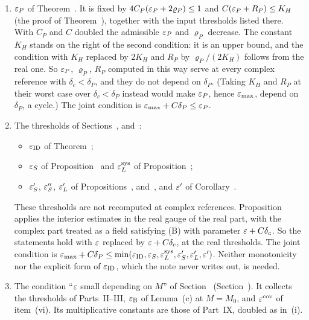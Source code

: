 \begin{detail}
\begin{step}
\begin{enumerate}[label=(\roman*)]
\item $\varepsilon_P$ of Theorem~. It is fixed by $4C_P(\varepsilon_P+2\varrho_P)\le1$ and $C(\varepsilon_P+R_P)\le K_H$ (the proof of Theorem~), together with the input thresholds listed there. With $C_P$ and $C$ doubled the admissible $\varepsilon_P$ and $\varrho_P$ decrease. The constant $K_H$ stands on the right of the second condition: it is an upper bound, and the condition with $K_H$ replaced by $2K_H$ and $R_P$ by $\varrho_P/(2K_H)$ follows from the real one. So $\varepsilon_P$, $\varrho_P$, $R_P$ computed in this way serve at every complex reference with $\delta_c<\delta_P$, and they do not depend on $\delta_P$. (Taking $K_H$ and $R_P$ at their worst case over $\delta_c<\delta_P$ instead would make $\varepsilon_P$, hence $\varepsilon_{\max}$, depend on $\delta_P$, a cycle.) The joint condition is $\varepsilon_{\max}+C\delta_P\le\varepsilon_P$.
\item The thresholds of Sections~,  and~:
\begin{itemize}
\item $\varepsilon_{\rm ID}$ of Theorem~;
\item $\varepsilon_S$ of Proposition~ and $\varepsilon_L^{\rm sys}$ of Proposition~;
\item $\varepsilon'_S$, $\varepsilon''_S$, $\varepsilon'_L$ of Propositions~,  and~, and $\varepsilon'$ of Corollary~.
\end{itemize}
These thresholds are not recomputed at complex references. Proposition~ applies the interior estimates in the real gauge of the real part, with the complex part treated as a field satisfying (B) with parameter $\varepsilon+C\delta_c$. So the statements hold with $\varepsilon$ replaced by $\varepsilon+C\delta_c$, at the real thresholds. The joint condition is $\varepsilon_{\max}+C\delta_P\le\min(\varepsilon_{\rm ID},\varepsilon_S,\varepsilon_L^{\rm sys},\varepsilon'_S,\varepsilon'_L,\varepsilon')$. Neither monotonicity nor the explicit form of $\varepsilon_{\rm ID}$, which the note never writes out, is needed.
\item The condition ``$\varepsilon$ small depending on $M$'' of Section~ (Section~). It collects the thresholds of Parts~II--III, $\varepsilon_{\rm B}$ of Lemma~(c) at $M=M_0$, and $\varepsilon^{\rm cov}$ of item~(vi). Its multiplicative constants are those of Part~IX, doubled as in~(i).

\end{enumerate}
\end{step}
\end{detail}
